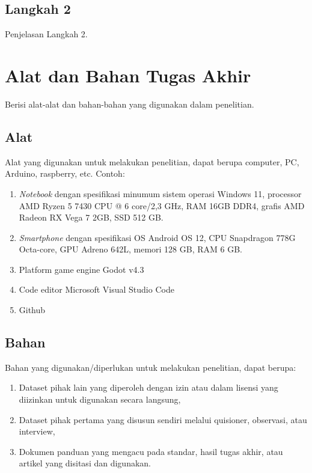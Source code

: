 \subsection{Langkah 2} \label{III.Langkah 2}
Penjelasan Langkah 2. \par

\section{Alat dan Bahan Tugas Akhir} \label{III.Alat dan Bahan}
Berisi alat-alat dan bahan-bahan yang digunakan dalam penelitian. \par

\subsection{Alat} \label{III.Alat}
Alat yang digunakan untuk melakukan penelitian, dapat berupa computer, PC, Arduino, raspberry, etc. Contoh: \par
\begin{enumerate}[noitemsep]
	\item \textit{Notebook} dengan spesifikasi minumum sistem operasi Windows 11, processor AMD Ryzen 5 7430 CPU @ 6 core/2,3 GHz, RAM 16GB DDR4, grafis AMD Radeon RX Vega 7 2GB, SSD 512 GB.
	\item \textit{Smartphone} dengan spesifikasi OS Android OS 12, CPU Snapdragon 778G Octa-core, GPU Adreno 642L, memori 128 GB, RAM 6 GB.
	\item Platform game engine Godot v4.3
	\item Code editor Microsoft Visual Studio Code
	\item Github
\end{enumerate}

\subsection{Bahan} \label{III.Bahan}
Bahan yang digunakan/diperlukan untuk melakukan penelitian, dapat berupa: \par
\begin{enumerate}[noitemsep]
	\item Dataset pihak lain yang diperoleh dengan izin atau dalam lisensi yang diizinkan untuk digunakan secara langsung,
	\item Dataset pihak pertama yang disusun sendiri melalui quisioner, observasi, atau interview,
	\item Dokumen panduan yang mengacu pada standar, hasil tugas akhir, atau artikel yang disitasi dan digunakan. 
\end{enumerate}

